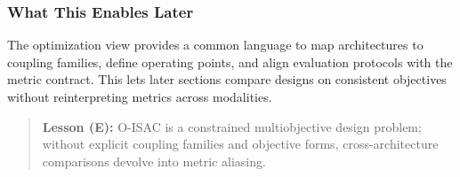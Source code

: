 \subsubsection{What This Enables Later}
The optimization view provides a common language to map architectures to coupling families, define operating points, and align evaluation protocols with the metric contract. This lets later sections compare designs on consistent objectives without reinterpreting metrics across modalities.

\begin{quote}
\textbf{Lesson (E):} O-ISAC is a constrained multiobjective design problem; without explicit coupling families and objective forms, cross-architecture comparisons devolve into metric aliasing.
\end{quote}
